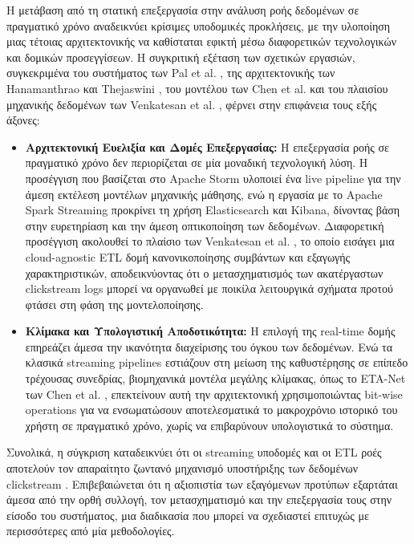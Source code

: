 \documentclass[12pt,a4paper]{article}
\begin{document}
	Η μετάβαση από τη στατική επεξεργασία στην ανάλυση ροής δεδομένων σε πραγματικό χρόνο αναδεικνύει κρίσιμες υποδομικές προκλήσεις, με την υλοποίηση μιας τέτοιας αρχιτεκτονικής να καθίσταται εφικτή μέσω διαφορετικών τεχνολογικών και δομικών προσεγγίσεων. Η συγκριτική εξέταση των σχετικών εργασιών, συγκεκριμένα του συστήματος των Pal et al. \cite{Apache}, της αρχιτεκτονικής των Hanamanthrao και Thejaswini \cite{RealTimeClickstream}, του μοντέλου των Chen et al. \cite{chen2022eta} και του πλαισίου μηχανικής δεδομένων των Venkatesan et al. \cite{Venkatesan2026}, φέρνει στην επιφάνεια τους εξής άξονες:
	
	\begin{itemize}
		\item \textbf{Αρχιτεκτονική Ευελιξία και Δομές Επεξεργασίας:} Η επεξεργασία ροής σε πραγματικό χρόνο δεν περιορίζεται σε μία μοναδική τεχνολογική λύση. Η προσέγγιση που βασίζεται στο Apache Storm \cite{Apache} υλοποιεί ένα live pipeline για την άμεση εκτέλεση μοντέλων μηχανικής μάθησης, ενώ η εργασία με το Apache Spark Streaming \cite{RealTimeClickstream} προκρίνει τη χρήση Elasticsearch και Kibana, δίνοντας βάση στην ευρετηρίαση και την άμεση οπτικοποίηση των δεδομένων. Διαφορετική προσέγγιση ακολουθεί το πλαίσιο των Venkatesan et al. \cite{Venkatesan2026}, το οποίο εισάγει μια cloud-agnostic ETL δομή κανονικοποίησης συμβάντων και εξαγωγής χαρακτηριστικών, αποδεικνύοντας ότι ο μετασχηματισμός των ακατέργαστων clickstream logs μπορεί να οργανωθεί με ποικίλα λειτουργικά σχήματα προτού φτάσει στη φάση της μοντελοποίησης.
		\item \textbf{Κλίμακα και Υπολογιστική Αποδοτικότητα:} Η επιλογή της real-time δομής επηρεάζει άμεσα την ικανότητα διαχείρισης του όγκου των δεδομένων. Ενώ τα κλασικά streaming pipelines \cite{Apache, RealTimeClickstream} εστιάζουν στη μείωση της καθυστέρησης σε επίπεδο τρέχουσας συνεδρίας, βιομηχανικά μοντέλα μεγάλης κλίμακας, όπως το ETA-Net των Chen et al. \cite{chen2022eta}, επεκτείνουν αυτή την αρχιτεκτονική χρησιμοποιώντας bit-wise operations για να ενσωματώσουν αποτελεσματικά το μακροχρόνιο ιστορικό του χρήστη σε πραγματικό χρόνο, χωρίς να επιβαρύνουν υπολογιστικά το σύστημα.
	\end{itemize}
	
	Συνολικά, η σύγκριση καταδεικνύει ότι οι streaming υποδομές και οι ETL ροές αποτελούν τον απαραίτητο ζωντανό μηχανισμό υποστήριξης των δεδομένων clickstream \cite{RealTimeClickstream, Venkatesan2026}. Επιβεβαιώνεται ότι η αξιοπιστία των εξαγόμενων προτύπων εξαρτάται άμεσα από την ορθή συλλογή, τον μετασχηματισμό και την επεξεργασία τους στην είσοδο του συστήματος, μια διαδικασία που μπορεί να σχεδιαστεί επιτυχώς με περισσότερες από μία μεθοδολογίες.
	
\end{document}
